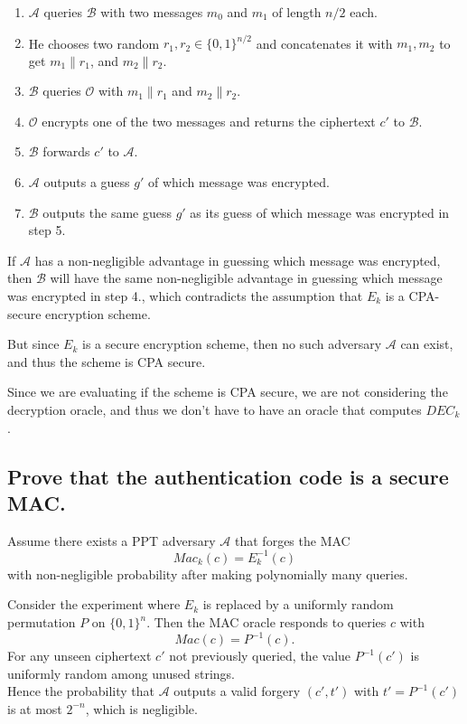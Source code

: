 \documentclass{article}
\begin{document}
\begin{enumerate}
    \item $\mathcal{A}$ queries $\mathcal{B}$ with two messages $m_0$ and $m_1$ of length $n/2$ each.
    \item He chooses two random $r_1, r_2 \in \{0, 1\}^{n/2}$ and concatenates it with $m_1, m_2$ to get $m_1 \| r_1$, and $m_2 \| r_2$.
    \item $\mathcal{B}$ queries $\mathcal{O}$ with $m_1 \| r_1$ and $m_2 \| r_2$.
    \item $\mathcal{O}$ encrypts one of the two messages and returns the ciphertext $c'$ to $\mathcal{B}$.
    \item $\mathcal{B}$ forwards $c'$ to $\mathcal{A}$.
    \item $\mathcal{A}$ outputs a guess $g'$ of which message was encrypted.
    \item $\mathcal{B}$ outputs the same guess $g'$ as its guess of which message was encrypted in step 5.
\end{enumerate}
If $\mathcal{A}$ has a non-negligible advantage in guessing which message was encrypted, then $\mathcal{B}$ will have the same non-negligible advantage in guessing which message was encrypted in step 4., which contradicts the assumption that $E_k$ is a CPA-secure encryption scheme.

But since $E_k$ is a secure encryption scheme, then no such adversary $\mathcal{A}$ can exist, and thus the scheme is CPA secure.

Since we are evaluating if the scheme is CPA secure, we are not considering the decryption oracle, and thus we don't have to have an oracle that computes $DEC_k$.

\subsection{Prove that the authentication code is a secure MAC.}
Assume there exists a PPT adversary $\mathcal A$ that forges the MAC
\[
Mac_k(c)=E_k^{-1}(c)
\]
with non-negligible probability after making polynomially many queries.

Consider the experiment where $E_k$ is replaced by a uniformly random permutation $P$ on $\{0,1\}^n$. Then the MAC oracle responds to queries $c$ with 
\[
Mac(c)=P^{-1}(c).
\]
For any unseen ciphertext $c'$ not previously queried, the value $P^{-1}(c')$ is uniformly random among unused strings.\\
Hence the probability that $\mathcal A$ outputs a valid forgery $(c' ,t')$ with $t'=P^{-1}(c')$ is at most $2^{-n}$, which is negligible.
\end{document}
